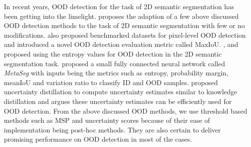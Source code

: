     In recent years, OOD detection for the task of 2D semantic segmentation has been getting into the limelight.
    \cite{pixel_OOD} proposes the adaption of a few above discussed OOD detection methods to the task of 2D semantic segmentation with few or no modifications.
    \cite{pixel_OOD} also proposed benchmarked datasets for pixel-level OOD detection and introduced a novel OOD detection evaluation metric called MaxIoU.
    \cite{SemSeg_Entropy1}, and \cite{SemSeg_Entropy2} proposed using the entropy values for OOD detection in the 2D semantic segmentation task.
    \cite{MetaSeg} proposed a small fully connected neural network called \textit{MetaSeg} with inputs being the metrics such as entropy, probability margin, meanIoU and variation ratio to classify ID and OOD samples.
    \cite{uncertianty_distillation} proposed uncertainty distillation to compute uncertainty estimates similar to knowledge distillation and argues these uncertainty estimates can be efficiently used for OOD detection.
    From the above discussed OOD methods, we use threshold based methods such as MSP and uncertainty scores because of their ease of implementation being post-hoc methods.
    They are also certain to deliver promising performance on OOD detection in most of the cases.
    


